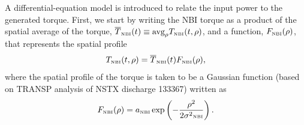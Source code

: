 \documentclass[12pt]{iopart}
\begin{document}
A differential-equation model is introduced to relate the input power to the generated torque.  First, we start by writing the NBI torque as a product of the spatial average of the torque, $\overline{T}_\textrm{\tiny{NBI}}(t) \equiv \textrm{avg}_\rho T_\textrm{\tiny{NBI}}(t,\rho)$, and a function, $F_\textrm{\tiny{NBI}}(\rho)$, that represents the spatial profile
\begin{equation}
   T_\textrm{\tiny{NBI}}(t,\rho) = \overline{T}_\textrm{\tiny{NBI}}(t) F_\textrm{\tiny{NBI}}(\rho),
\label{eq5}
\end{equation}
where the spatial profile of the torque is taken to be a Gaussian function (based on TRANSP analysis of NSTX discharge 133367) written as
\begin{equation}
F_\textrm{\tiny{NBI}}(\rho) = a_\textrm{\tiny{NBI}} \exp\left( - \frac{\rho^2}{2\sigma^2\textrm{\tiny{NBI}}}\right).
\label{eq6}
\end{equation}
\end{document}
